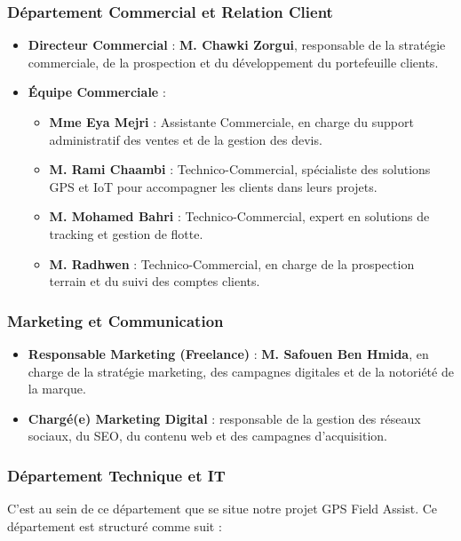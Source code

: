 \documentclass[12pt,a4paper]{report}
\begin{document}
\subsubsection*{Département Commercial et Relation Client}
\begin{itemize}
    \item \textbf{Directeur Commercial} : \textbf{M. Chawki Zorgui}, responsable de la stratégie commerciale, de la prospection et du développement du portefeuille clients.
    
    \item \textbf{Équipe Commerciale} :
    \begin{itemize}
        \item \textbf{Mme Eya Mejri} : Assistante Commerciale, en charge du support administratif des ventes et de la gestion des devis.
        \item \textbf{M. Rami Chaambi} : Technico-Commercial, spécialiste des solutions GPS et IoT pour accompagner les clients dans leurs projets.
        \item \textbf{M. Mohamed Bahri} : Technico-Commercial, expert en solutions de tracking et gestion de flotte.
        \item \textbf{M. Radhwen} : Technico-Commercial, en charge de la prospection terrain et du suivi des comptes clients.
    \end{itemize}
\end{itemize}

\subsubsection*{Marketing et Communication}
\begin{itemize}
    \item \textbf{Responsable Marketing (Freelance)} : \textbf{M. Safouen Ben Hmida}, en charge de la stratégie marketing, des campagnes digitales et de la notoriété de la marque.
    
    \item \textbf{Chargé(e) Marketing Digital} : responsable de la gestion des réseaux sociaux, du SEO, du contenu web et des campagnes d'acquisition.
\end{itemize}

\subsubsection*{Département Technique et IT}
\noindent C'est au sein de ce département que se situe notre projet GPS Field Assist. Ce département est structuré comme suit :
\end{document}
